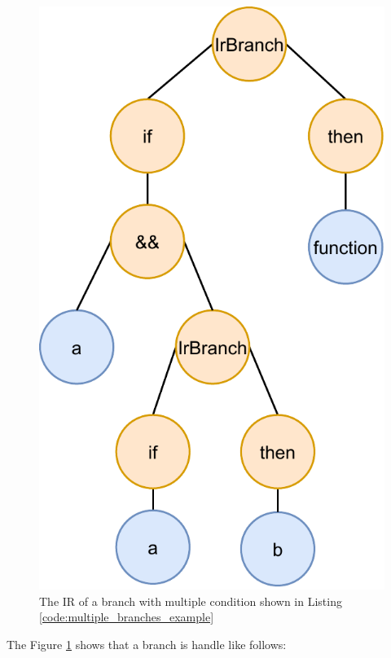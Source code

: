 \begin{figure}[!ht]
    \centering
    \includegraphics[scale=0.75]{document/chapters/3-alignment/images/ir_representation_branches.pdf}
    \caption{The IR of a branch with multiple condition shown in Listing \ref{code:multiple_branches_example}}
    \label{fig:multiple_branches_ir_example}
\end{figure}
The Figure \ref{fig:multiple_branches_ir_example} shows that a branch is handle like follows:
